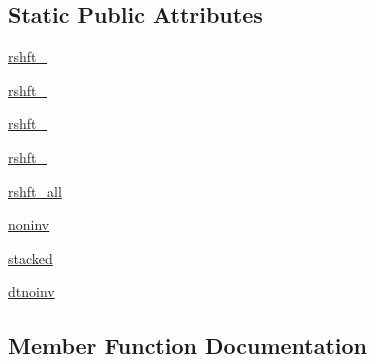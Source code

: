 \subsection*{Static Public Attributes}
\begin{DoxyCompactItemize}
\item 
\hyperlink{classnumpy_1_1linalg_1_1tests_1_1test__linalg_1_1TestMatrixPower_a6bc73a42dfb6eeae830a07fe31ef754e}{rshft\+\_}
\item 
\hyperlink{classnumpy_1_1linalg_1_1tests_1_1test__linalg_1_1TestMatrixPower_af3dd0529a9a5d54c34098fddb293f2a0}{rshft\+\_}
\item 
\hyperlink{classnumpy_1_1linalg_1_1tests_1_1test__linalg_1_1TestMatrixPower_ae2fc1371a619ae99019518481a4f77d9}{rshft\+\_}
\item 
\hyperlink{classnumpy_1_1linalg_1_1tests_1_1test__linalg_1_1TestMatrixPower_aa9e6b5e540e02df3f320624de1dd2317}{rshft\+\_}
\item 
\hyperlink{classnumpy_1_1linalg_1_1tests_1_1test__linalg_1_1TestMatrixPower_a66389cb9b488de2c52483599fdc69a09}{rshft\+\_\+all}
\item 
\hyperlink{classnumpy_1_1linalg_1_1tests_1_1test__linalg_1_1TestMatrixPower_a0ccdcbd5f703557ab2aa4276e1b27bfa}{noninv}
\item 
\hyperlink{classnumpy_1_1linalg_1_1tests_1_1test__linalg_1_1TestMatrixPower_ae75e96e651214b12380413c80b6730c3}{stacked}
\item 
\hyperlink{classnumpy_1_1linalg_1_1tests_1_1test__linalg_1_1TestMatrixPower_a60dff8b5ef2fb4af0cbbc0d9511fccad}{dtnoinv}
\end{DoxyCompactItemize}


\subsection{Member Function Documentation}
\mbox{\label{classnumpy_1_1linalg_1_1tests_1_1test__linalg_1_1TestMatrixPower_aa7cd07cd3fb45a3b3bc982cb2dd81531}} 
